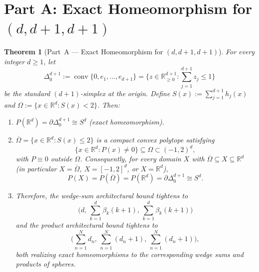 \documentclass[11pt]{article}
\theoremstyle{plain}
\newtheorem{theorem}{Theorem}
\theoremstyle{definition}
\theoremstyle{remark}
\DeclareMathOperator{\conv}{conv}
\begin{document}
\section{Part A: Exact Homeomorphism for $(d, d+1, d+1)$}

\begin{theorem}[Part~A --- Exact Homeomorphism for $(d, d+1, d+1)$]\label{thm:partA}
For every integer $d \ge 1$, let
\[
\Delta_0^{d+1} := \conv\{0, e_1, \dots, e_{d+1}\} = \biggl\{z \in \mathbb{R}_{\ge 0}^{d+1} : \sum_{j=1}^{d+1} z_j \le 1\biggr\}
\]
be the standard $(d+1)$-simplex at the origin. Define $S(x) := \sum_{j=1}^{d+1} h_j(x)$ and $\Omega := \{x \in \mathbb{R}^d : S(x) < 2\}$. Then:
\begin{enumerate}[label=\textup{(\arabic*)}]
\item $P(\mathbb{R}^d) = \partial \Delta_0^{d+1} \cong S^d$ (exact homeomorphism).
\item $\overline{\Omega} = \{x \in \mathbb{R}^d : S(x) \le 2\}$ is a compact convex polytope satisfying
\[
\{x \in \mathbb{R}^d : P(x) \neq 0\} \subseteq \Omega \subset (-1, 2)^d,
\]
with $P \equiv 0$ outside $\Omega$. Consequently, for every domain $X$ with $\overline{\Omega} \subseteq X \subseteq \mathbb{R}^d$ (in particular $X = \overline{\Omega}$, $X = [-1,2]^d$, or $X = \mathbb{R}^d$),
\[
P(X) = P(\overline{\Omega}) = P(\mathbb{R}^d) = \partial \Delta_0^{d+1} \cong S^d.
\]
\item Therefore, the wedge-sum architectural bound tightens to
\[
\biggl(d,\, \sum_{k=1}^d \beta_k(k+1),\, \sum_{k=1}^d \beta_k(k+1)\biggr)
\]
and the product architectural bound tightens to
\[
\biggl(\sum_{n=1}^N d_n,\, \sum_{n=1}^N (d_n+1),\, \sum_{n=1}^N (d_n+1)\biggr),
\]
both realizing exact homeomorphisms to the corresponding wedge sums and products of spheres.
\end{enumerate}
\end{theorem}
\end{document}
